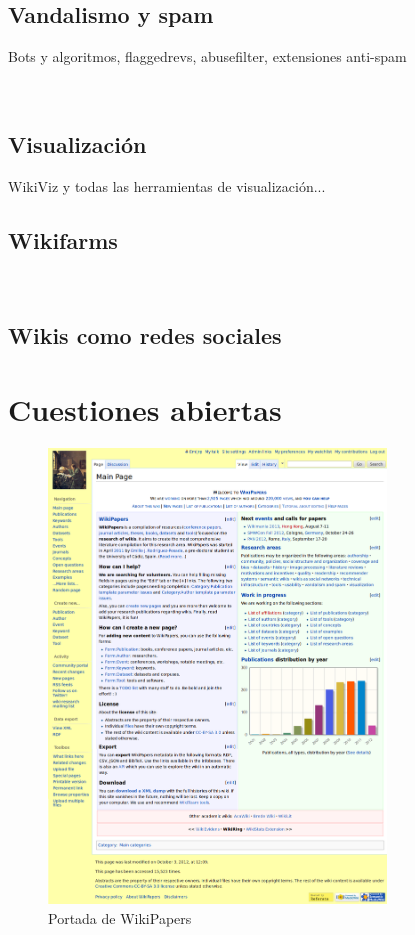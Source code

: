 \documentclass[11pt,onecolumn]{article}
\begin{document}
\subsection{Vandalismo y spam}

Bots y algoritmos, flaggedrevs, abusefilter, extensiones anti-spam

~\citep{avbot2011}
~\citep{avbot2010}
~\citep{avbot2009}

\subsection{Visualización}

WikiViz y todas las herramientas de visualización...


\subsection{Wikifarms}

~\citep{kittur2010}

\subsection{Wikis como redes sociales}


\section{Cuestiones abiertas}


\begin{figure}[htb]
\centering
\includegraphics[width=0.8\textwidth]{wpfull.png}
\caption{Portada de WikiPapers}
\label{fig:wpfull}
\end{figure}
\end{document}

